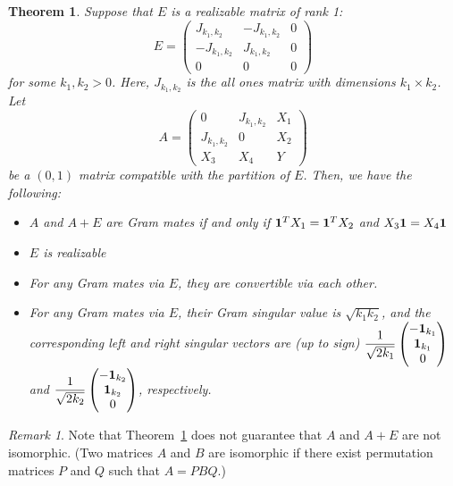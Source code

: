 \documentclass[11pt]{article}
\newtheorem{thm}{Theorem}
\theoremstyle{definition}
\theoremstyle{remark}
\newtheorem{remark}{Remark}
\begin{document}
\begin{thm} 
\label{thm:thm47}
Suppose that $E$ is a realizable matrix of rank 1:
\[
E = \begin{pmatrix}
J_{k_{1}, k_{2}} & -J_{k_{1}, k_{2}} & 0 \\
-J_{k_{1}, k_{2}} & J_{k_{1}, k_{2}} & 0 \\
0 & 0 & 0
\end{pmatrix}
\]
for some $k_1, k_2 > 0$. Here, $J_{k_{1}, k_{2}}$ is the all ones matrix with dimensions $k_1 \times k_2$. Let
\[
A = \begin{pmatrix}
0 & J_{k_{1}, k_{2}} & X_{1} \\
J_{k_{1}, k_{2}} & 0 & X_{2} \\
X_{3} & X_{4} & Y
\end{pmatrix}
\]
be a $(0, 1)$ matrix compatible with the partition of $E$. Then, we have the following:
\begin{itemize}
\item[(i)] $A$ and $A+E$ are Gram mates if and only if ${\bf 1}^{T} X_{1} = {\bf 1}^{T} X_{2}$ and $X_{3}{\bf 1} = X_{4}{\bf 1} $
\item[(ii)] $E$ is realizable
\item[(iii)] For any Gram mates via $E$, they are convertible via each other. 
\item[(iv)] For any Gram mates via $E$, their Gram singular value is $\sqrt{k_1 k_2}$, and the corresponding left and right singular vectors are (up to sign) 
$\dfrac{1}{\sqrt{2k_1}}
\begin{pmatrix}
 -{\bf 1}_{k_{1}}  \\
 {\bf 1}_{k_{1}} \\
 0 
 \end{pmatrix}$ and 
 $\dfrac{1}{\sqrt{2k_2}}
\begin{pmatrix}
 -{\bf 1}_{k_{2}}  \\
 {\bf 1}_{k_{2}} \\
 0 
 \end{pmatrix}$, respectively. 
\end{itemize}

\end{thm}

\begin{remark}
Note that Theorem~\ref{thm:thm47} does not guarantee that $A$ and $A+E$ are not isomorphic. (Two matrices $A$ and $B$ are isomorphic if there exist permutation matrices $P$ and $Q$ such that $A = PBQ$.)
\end{remark}
\end{document}
